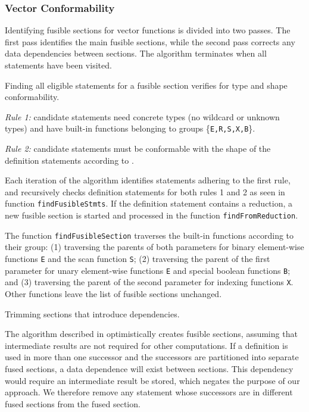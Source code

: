 \subsubsection{Vector Conformability}

Identifying fusible sections for vector functions is divided into two passes.
The first pass identifies the main fusible sections, while the second pass corrects
any data dependencies between sections. The algorithm terminates when all statements
have been visited.

 Finding all eligible statements for a fusible section verifies for type
and shape conformability.

\textit{Rule 1:} candidate statements need concrete types (no wildcard or unknown types)
and have built-in functions belonging to groups \{\texttt{E,R,S,X,B}\}.

\textit{Rule 2:} candidate statements must be conformable with the shape of the definition
statements according to .

Each iteration of the algorithm identifies statements adhering to the first rule, and
recursively checks definition statements for both rules 1 and 2 as seen in function
\texttt{findFusibleStmts}. If the definition statement contains a reduction, a new
fusible section is started and processed in the function \texttt{findFromReduction}.

The function \texttt{findFusibleSection} traverses the built-in functions according to
their group:
(1) traversing the parents of both parameters for binary element-wise functions
\texttt{E} and the scan function \texttt{S};
(2) traversing the parent of the first parameter for unary element-wise
functions \texttt{E} and special boolean functions \texttt{B}; and
(3) traversing the parent of the second parameter for indexing functions \texttt{X}.
Other functions leave the list of fusible sections unchanged.

 Trimming sections that introduce dependencies.

The algorithm described in  optimistically creates fusible
sections, assuming that intermediate results are not required for other computations. If a
definition is used in more than one successor and the successors are partitioned into
separate fused sections, a data dependence will exist between sections. This dependency
would require an intermediate result be stored, which negates the purpose of our approach.
We therefore remove any statement whose successors are in different fused sections from
the fused section.


